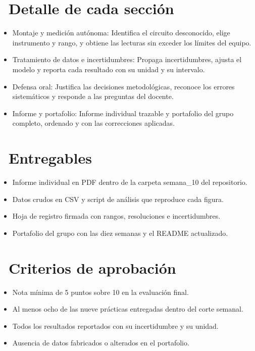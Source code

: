 \documentclass[11pt,a4paper]{article}
\newcommand{\iconotexto}[2]{\textcolor{cyanNeon}{\faIcon{#1}}~#2}
\begin{document}
\section{\iconotexto{list-ul}{Detalle de cada sección}}

\begin{itemize}[leftmargin=1.4em,itemsep=2pt,topsep=3pt]
  \item Montaje y medición autónoma: Identifica el circuito desconocido, elige instrumento y rango, y obtiene las lecturas sin exceder los límites del equipo.
  \item Tratamiento de datos e incertidumbres: Propaga incertidumbres, ajusta el modelo y reporta cada resultado con su unidad y su intervalo.
  \item Defensa oral: Justifica las decisiones metodológicas, reconoce los errores sistemáticos y responde a las preguntas del docente.
  \item Informe y portafolio: Informe individual trazable y portafolio del grupo completo, ordenado y con las correcciones aplicadas.
\end{itemize}

\section{\iconotexto{box-open}{Entregables}}

\begin{itemize}[leftmargin=1.4em,itemsep=2pt,topsep=3pt]
  \item Informe individual en PDF dentro de la carpeta semana\_10 del repositorio.
  \item Datos crudos en CSV y script de análisis que reproduce cada figura.
  \item Hoja de registro firmada con rangos, resoluciones e incertidumbres.
  \item Portafolio del grupo con las diez semanas y el README actualizado.
\end{itemize}

\section{\iconotexto{check-circle}{Criterios de aprobación}}

\begin{itemize}[leftmargin=1.4em,itemsep=2pt,topsep=3pt]
  \item Nota mínima de 5 puntos sobre 10 en la evaluación final.
  \item Al menos ocho de las nueve prácticas entregadas dentro del corte semanal.
  \item Todos los resultados reportados con su incertidumbre y su unidad.
  \item Ausencia de datos fabricados o alterados en el portafolio.
\end{itemize}
\end{document}
